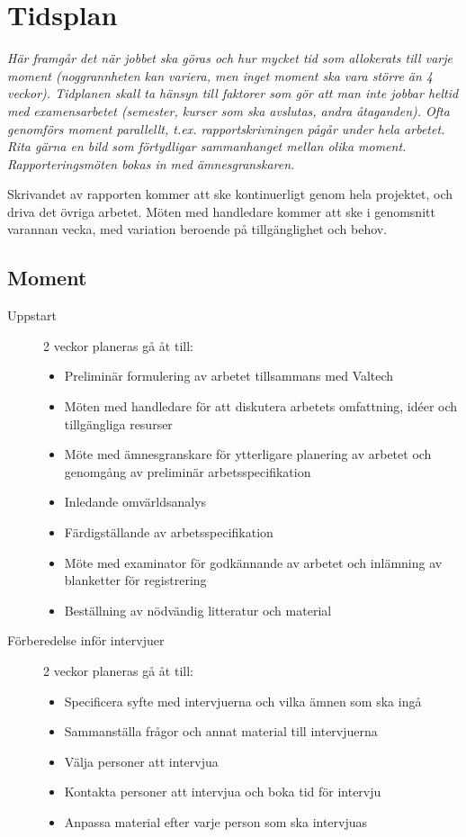 \documentclass[11pt]{article}
\begin{document}
\section{Tidsplan}

\textit{Här framgår det när jobbet ska göras och hur mycket tid som allokerats till varje moment (noggrannheten kan variera, men inget moment ska vara större än 4 veckor). Tidplanen skall ta hänsyn till faktorer som gör att man inte jobbar heltid med examensarbetet (semester, kurser som ska avslutas, andra åtaganden). Ofta genomförs moment parallellt, t.ex. rapportskrivningen pågår under hela arbetet. Rita gärna en bild som förtydligar sammanhanget mellan olika moment. Rapporteringsmöten bokas in med ämnesgranskaren.}

Skrivandet av rapporten kommer att ske kontinuerligt genom hela projektet, och driva det övriga arbetet. Möten med handledare kommer att ske i genomsnitt varannan vecka, med variation beroende på tillgänglighet och behov.

\subsection{Moment}

\begin{description}

\item[Uppstart] 2 veckor planeras gå åt till:
\begin{itemize}
  \item Preliminär formulering av arbetet tillsammans med Valtech
  \item Möten med handledare för att diskutera arbetets omfattning, idéer och tillgängliga resurser
  \item Möte med ämnesgranskare för ytterligare planering av arbetet och genomgång av preliminär arbetsspecifikation
  \item Inledande omvärldsanalys
  \item Färdigställande av arbetsspecifikation
  \item Möte med examinator för godkännande av arbetet och inlämning av blanketter för registrering
  \item Beställning av nödvändig litteratur och material
\end{itemize}

\item[Förberedelse inför intervjuer] 2 veckor planeras gå åt till:
\begin{itemize}
  \item Specificera syfte med intervjuerna och vilka ämnen som ska ingå
  \item Sammanställa frågor och annat material till intervjuerna
  \item Välja personer att intervjua
  \item Kontakta personer att intervjua och boka tid för intervju
  \item Anpassa material efter varje person som ska intervjuas
\end{itemize}

\end{description}
\end{document}
